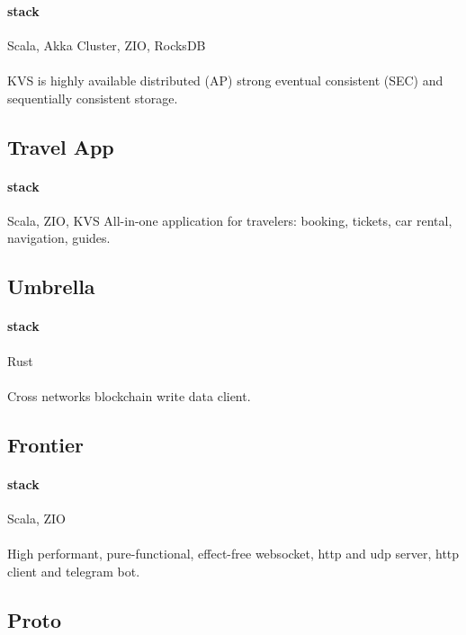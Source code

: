 \paragraph{stack} Scala, Akka Cluster, ZIO, RocksDB
\paragraph{}
KVS is highly available distributed (AP) strong eventual consistent (SEC) and sequentially consistent storage.

\subsection{Travel App}
\paragraph{stack} Scala, ZIO, KVS
All-in-one application for travelers: booking, tickets, car rental, navigation, guides.

\subsection{Umbrella}
\paragraph{stack} Rust
\paragraph{}
Cross networks blockchain write data client.

\subsection{Frontier}
\paragraph{stack} Scala, ZIO
\paragraph{}
High performant, pure-functional, effect-free websocket, http and udp server, http client and telegram bot.

\subsection{Proto}
